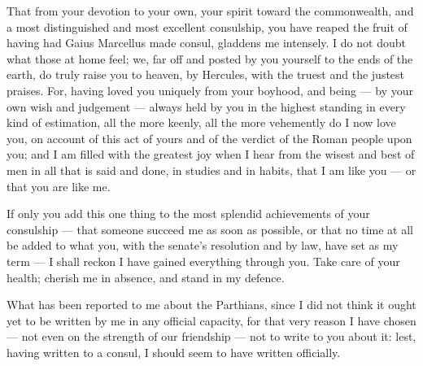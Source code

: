 

 That from your devotion to your own, your spirit toward the commonwealth, and a most distinguished and most excellent consulship, you have reaped the fruit of having had Gaius Marcellus made consul, gladdens me intensely. I do not doubt what those at home feel; we, far off and posted by you yourself to the ends of the earth, do truly raise you to heaven, by Hercules, with the truest and the justest praises. For, having loved you uniquely from your boyhood, and being --- by your own wish and judgement --- always held by you in the highest standing in every kind of estimation, all the more keenly, all the more vehemently do I now love you, on account of this act of yours and of the verdict of the Roman people upon you; and I am filled with the greatest joy when I hear from the wisest and best of men in all that is said and done, in studies and in habits, that I am like you --- or that you are like me.

 If only you add this one thing to the most splendid achievements of your consulship --- that someone succeed me as soon as possible, or that no time at all be added to what you, with the senate's resolution and by law, have set as my term --- I shall reckon I have gained everything through you. Take care of your health; cherish me in absence, and stand in my defence.

 What has been reported to me about the Parthians, since I did not think it ought yet to be written by me in any official capacity, for that very reason I have chosen --- not even on the strength of our friendship --- not to write to you about it: lest, having written to a consul, I should seem to have written officially.
